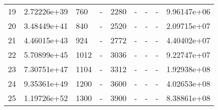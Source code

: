 \begin{table}
\begin{tabular}{lllllllll}
19 &  2.72226e+39 &   760 &     - &  2280 &    - &     - &        - &  9.96147e+06 \\
20 &  3.48449e+41 &   840 &     - &  2520 &    - &     - &        - &  2.09715e+07 \\
21 &  4.46015e+43 &   924 &     - &  2772 &    - &     - &        - &  4.40402e+07 \\
22 &  5.70899e+45 &  1012 &     - &  3036 &    - &     - &        - &  9.22747e+07 \\
23 &  7.30751e+47 &  1104 &     - &  3312 &    - &     - &        - &  1.92938e+08 \\
24 &  9.35361e+49 &  1200 &     - &  3600 &    - &     - &        - &  4.02653e+08 \\
25 &  1.19726e+52 &  1300 &     - &  3900 &    - &     - &        - &  8.38861e+08 \\
\bottomrule
\end{tabular}
\end{table}
